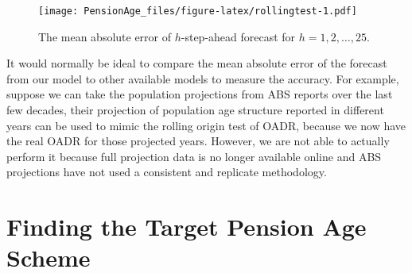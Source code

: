 \documentclass[11pt,a4paper,]{article}
\begin{document}
\begin{figure}
\centering
\texttt{[image: PensionAge\_files/figure-latex/rollingtest-1.pdf]}
\caption{\label{fig:rollingtest}The mean absolute error of \(h\)-step-ahead forecast for \(h=1,2,\dots,25\).}
\end{figure}

It would normally be ideal to compare the mean absolute error of the forecast from our model to other available models to measure the accuracy. For example, suppose we can take the population projections from ABS reports over the last few decades, their projection of population age structure reported in different years can be used to mimic the rolling origin test of OADR, because we now have the real OADR for those projected years. However, we are not able to actually perform it because full projection data is no longer available online and ABS projections have not used a consistent and replicate methodology.

\hypertarget{sec:target}{%
\section{Finding the Target Pension Age Scheme}\label{sec:target}}
\end{document}
